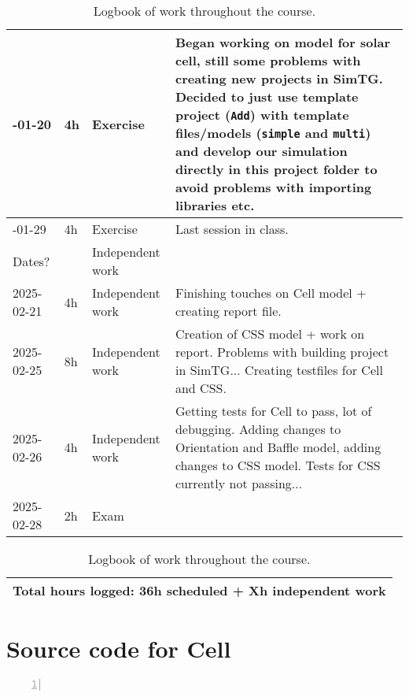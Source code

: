 \begin{appendices}
\begin{table}[H]
\begin{tabularx}{\textwidth} {
    | >{\hsize=0.3\hsize}X     %
    | >{\hsize=0.2\hsize}X     %
    | >{\hsize=0.3\hsize}X      %
    | >{\hsize=2.15\hsize}X      %
    |}
        2025-01-20 & 4h & Exercise &  Began working on model for solar cell, still some problems with creating new projects in SimTG. Decided to just use template project (\texttt{Add}) with template files/models (\texttt{simple} and \texttt{multi}) and develop our simulation directly in this project folder to avoid problems with importing libraries etc.     
        \\ \hline
        
        2025-01-29 & 4h & Exercise &  Last session in class.  \\ \hline
        
        Dates?     && Independent work & \\ \hline

        2025-02-21 & 4h & Independent work &  Finishing touches on Cell model + creating report file. \\ \hline

        2025-02-25 & 8h & Independent work &  Creation of CSS model + work on report. Problems with building project in SimTG... Creating testfiles for Cell and CSS. \\ \hline

        2025-02-26 & 4h & Independent work &  Getting tests for Cell to pass, lot of debugging. Adding changes to Orientation and Baffle model, adding changes to CSS model. Tests for CSS currently not passing... \\ \hline

        
        2025-02-28 & 2h & Exam &    \\ \hline
    \end{tabularx}
    \begin{tabularx}{\textwidth} {|X|}
         \hline
         \textbf{Total hours logged: 36h scheduled + Xh independent work} \\ \hline
    \end{tabularx}

    
    \caption{Logbook of work throughout the course.}
    \label{tab:logbook}
    
\end{table}






\newpage
\section{Source code for Cell}
\begin{lstlisting}[frame=single,
numbers=left, basicstyle=\tiny, language = C++]


\end{lstlisting}
\end{appendices}
